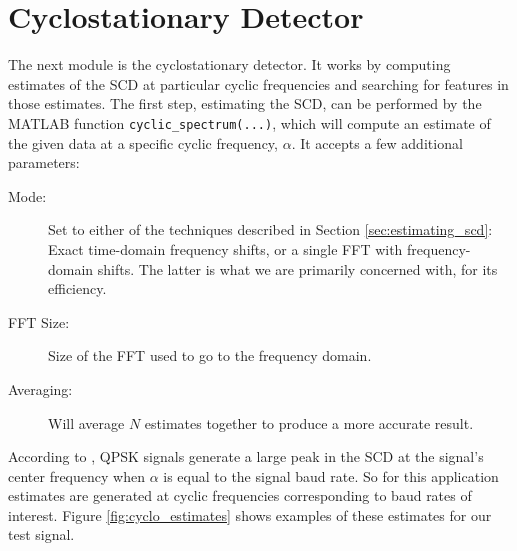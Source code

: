\documentclass[12pt]{report}
\begin{document}
\section{Cyclostationary Detector}
\label{sec:sim_cyclo}
The next module is the cyclostationary detector. It works by computing
estimates of the SCD at particular cyclic frequencies and searching for
features in those estimates. The first step, estimating the SCD, can be
performed by the MATLAB function \texttt{cyclic\_spectrum(...)}, which will
compute an estimate of the given data at a specific cyclic frequency, $\alpha$.
It accepts a few additional parameters:

\begin{description}
    \item[Mode:] Set to either of the techniques described in Section
    \ref{sec:estimating_scd}: Exact time-domain frequency shifts, or a single
    FFT with frequency-domain shifts. The latter is what we are primarily concerned
    with, for its efficiency.
    \item[FFT Size:] Size of the FFT used to go to the frequency domain.
    \item[Averaging:] Will average $N$ estimates together to produce a more
        accurate
    result.
\end{description}

According to \cite{Gardner2}, QPSK signals generate a large peak in the SCD at
the signal's center frequency when $\alpha$ is equal to the signal baud rate.
So for this application estimates are generated at cyclic frequencies
corresponding to baud rates of interest. Figure \ref{fig:cyclo_estimates} shows
examples of these estimates for our test signal.
\end{document}
